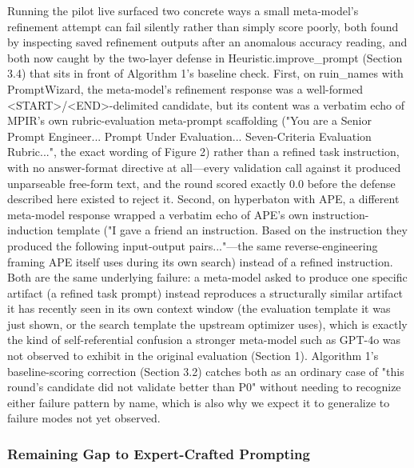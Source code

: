 \documentclass[a4paper,fleqn]{cas-sc}
\begin{document}
Running the pilot live surfaced two concrete ways a small meta-model's refinement attempt can fail silently rather than simply score poorly, both found by inspecting saved refinement outputs after an anomalous accuracy reading, and both now caught by the two-layer defense in Heuristic.improve\_\allowbreak{}prompt (Section 3.4) that sits in front of Algorithm 1's baseline check. First, on ruin\_\allowbreak{}names with PromptWizard, the meta-model's refinement response was a well-formed <START>/<END>-delimited candidate, but its content was a verbatim echo of MPIR's own rubric-evaluation meta-prompt scaffolding ("You are a Senior Prompt Engineer... Prompt Under Evaluation... Seven-Criteria Evaluation Rubric...", the exact wording of Figure 2) rather than a refined task instruction, with no answer-format directive at all---every validation call against it produced unparseable free-form text, and the round scored exactly 0.0 before the defense described here existed to reject it. Second, on hyperbaton with APE, a different meta-model response wrapped a verbatim echo of APE's own instruction-induction template ("I gave a friend an instruction. Based on the instruction they produced the following input-output pairs..."---the same reverse-engineering framing APE itself uses during its own search) instead of a refined instruction. Both are the same underlying failure: a meta-model asked to produce one specific artifact (a refined task prompt) instead reproduces a structurally similar artifact it has recently seen in its own context window (the evaluation template it was just shown, or the search template the upstream optimizer uses), which is exactly the kind of self-referential confusion a stronger meta-model such as GPT-4o was not observed to exhibit in the original evaluation (Section 1). Algorithm 1's baseline-scoring correction (Section 3.2) catches both as an ordinary case of "this round's candidate did not validate better than P0" without needing to recognize either failure pattern by name, which is also why we expect it to generalize to failure modes not yet observed.

\subsubsection{Remaining Gap to Expert-Crafted Prompting}
\end{document}
